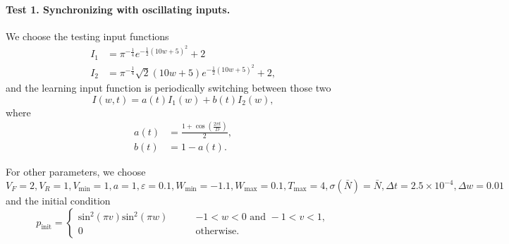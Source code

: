 \paragraph{Test 1. Synchronizing with oscillating inputs.}
We choose the testing input functions
\begin{equation}
    \begin{aligned}
        I_{1}&=\pi^{-\frac{1}{4}} e^{-\frac{1}{2}(10 w+5)^{2}}+2 \\
        I_{2}&=\pi^{-\frac{1}{4}} \sqrt{2}(10 w+5) e^{-\frac{1}{2}(10 w+5)^{2}}+2,
    \end{aligned}
\end{equation}
and the learning input function is periodically switching between those two
\begin{equation}
    \label{input}
    I(w,t)=a(t)I_1(w)+b(t)I_2(w),
\end{equation}
where
\begin{equation}
    \label{eq:input_coff}
    \begin{aligned}
        a(t)&=\frac{1+\cos(\frac{2\pi t}{D})}{2},\\
        b(t)&=1-a(t).
    \end{aligned}
\end{equation}

For other parameters, we choose $V_F=2,V_R=1,V_{\text{min}}=1,a=1,\varepsilon=0.1,W_{\text{min}}=-1.1,W_{\text{max}}=0.1,T_{\text{max}}=4,\sigma(\bar{N})=\bar{N},\Delta t=2.5\times 10^{-4},\Delta w=0.01$ and the initial condition 
\begin{equation}
    p_{\text{init}}=\begin{cases}
        \text{sin}^2(\pi v)\text{sin}^2(\pi w) \qquad &-1<w<0\text{ and }-1<v<1,\\
        0 &\text{otherwise}.
    \end{cases}
\end{equation}


